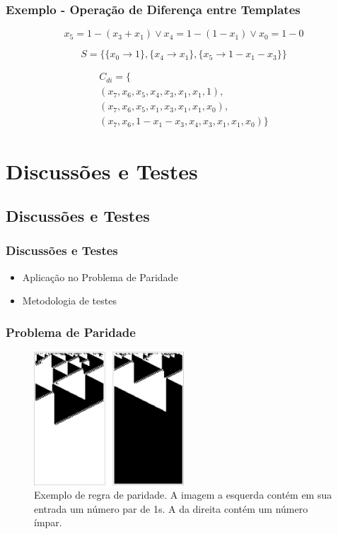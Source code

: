 \documentclass[aspectratio=43,hyperref={pdfpagelabels=false}]{beamer}
\begin{document}
\begin{frame}
    \frametitle{Exemplo - Operação de Diferença entre Templates}

    \begin{equation}
    x_5 = 1 - (x_3 + x_1) \vee x_4 = 1 - (1 - x_1) \vee x_0 = 1 - 0
    \label{eq:logicalComplement2}
    \end{equation}

    \begin{equation}
    S = \{\{x_0 \to 1\}, \{x_4 \to x_1\}, \{x_5 \to 1 - x_1 - x_3\}\}
    \label{eq:logicalComplement3}
    \end{equation}

    \begin{equation}
    \begin{split}
    C_{di} = \{\\(x_7, x_6, x_5, x_4, x_3, x_1, x_1, 1), \\(x_7, x_6, x_5, x_1, x_3, x_1, x_1, x_0), \\(x_7, x_6, 1 - x_1 - x_3, x_4, x_3, x_1, x_1, x_0)\}
    \end{split}
    \label{eq:logicalComplement3}
    \end{equation}

\end{frame}

 \section{Discussões e Testes}
 \subsection*{Discussões e Testes}
 \begin{frame}
     \frametitle{Discussões e Testes}
     \begin{itemize}
           \item Aplicação no Problema de Paridade
           \item Metodologia de testes
     \end{itemize}
 \end{frame}

\begin{frame}
    \frametitle{Problema de Paridade}
    \begin{figure}[h!]
        \centering
        \includegraphics[width=0.5\textwidth]{fig_parityRule.pdf}
        \caption{Exemplo de regra de paridade. A imagem a esquerda contém em sua entrada um número par de 1s. A da direita contém um número ímpar.}
    \end{figure}
\end{frame}
\end{document}
